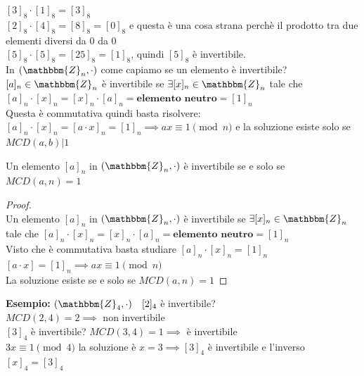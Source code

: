 \documentclass[12pt, letterpaper]{report}
\newcounter{theorem}
\begin{document}
\begin{enumerate}
			$[3]_8 \cdot [1]_8 = [3]_8$ \\
			$[2]_8 \cdot [4]_8 = [8]_8 = [0]_8$ e questa è una cosa strana perchè il prodotto tra due elementi diversi da 0 da 0\\
			$[5]_8 \cdot [5]_8 = [25]_8 = [1]_8$, quindi $[5]_8$ è invertibile. \\
			In $(\mathbbm{Z}_n, \cdot)$ come capiamo se un elemento è invertibile? \\
			$[a]_n \in \mathbbm{Z}_n$ è invertibile se $\exists [x]_n \in \mathbbm{Z}_n$ tale che $[a]_n \cdot [x]_n = [x]_n \cdot [a]_n = \textbf{elemento neutro} = [1]_n$ \\
			Questa è commutativa quindi basta risolvere: \\
			$[a]_n \cdot [x]_n = [a \cdot x]_n = [1]_n \implies ax \equiv 1 \pmod{n}$ e la soluzione esiste solo se $MCD(a,b) | 1$
			\begin{theorem}{}{}
				Un elemento $[a]_n$ in $(\mathbbm{Z}_n, \cdot)$ è invertibile se e solo se $MCD(a,n) = 1$
				\begin{proof} \quad \\
					Un elemento $[a]_n$ in $(\mathbbm{Z}_n, \cdot)$ è invertibile se $\exists [x]_n \in \mathbbm{Z}_n$ tale che $[a]_n \cdot [x]_n = [x]_n \cdot [a]_n = \textbf{elemento neutro} = [1]_n$ \\
					Visto che è commutativa basta studiare $[a]_n \cdot [x]_n = [1]_n$ \\
					$[a \cdot x] = [1]_n \implies ax \equiv 1 \pmod{n} $ \\
					La soluzione esiste se e solo se $MCD(a,n) = 1$
				\end{proof}
			\end{theorem}
			\textbf{Esempio:} $(\mathbbm{Z}_4, \cdot) \quad [2]_4$ è invertibile? \\
			$MCD(2,4) = 2 \implies$ non invertibile \\
			$[3]_4$ è invertibile? $MCD(3,4) = 1 \implies$ è invertibile \\
			$3x \equiv 1 \pmod{4}$ la soluzione è $x=3 \implies [3]_4$ è invertibile e l'inverso $[x]_4 = [3]_4$
		\end{enumerate}
\end{document}
